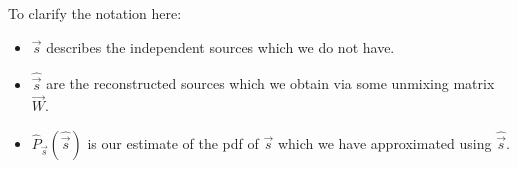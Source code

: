 To clarify the notation here:\\
\begin{itemize}
\vspace{-5mm}
\setlength\itemsep{0.1em}
\item $\vec s$ describes the independent sources which we do not have.
\item $\widehat{\vec s}$ are the reconstructed sources which we obtain via some unmixing matrix $\vec W$.
\item $\widehat{P}_{\vec s}(\widehat{\vec s})$ is our estimate of the pdf of $\vec s$ which we have approximated using $\widehat{\vec s}$. 
\end{itemize}

